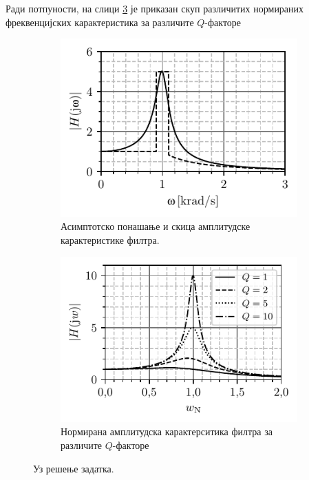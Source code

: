 Ради потпуности, на слици \ref{fig:\ID.freq_resp} је приказан скуп различитих нормираних фреквенцијских карактеристика
за различите $Q$-факторе

\begin{figure}
    \centering
    \begin{subfigure}[t]{0.45\textwidth}
        \includegraphics{fig/Q_ampl_approx.pdf}    
        \caption{Асимптотско понашање и скица амплитудске карактеристике филтра.}
        \label{fig:\ID.crtez}
    \end{subfigure}
    \begin{subfigure}[t]{0.45\textwidth}
        \includegraphics{fig/Q_razlicite_ampl_resp.pdf}    
        \caption{Нормирана амплитудска карактерситика филтра за различите $Q$-факторе}
        \label{fig:\ID.freq_resp}
    \end{subfigure}
    \caption{Уз решење задатка.}
\end{figure}